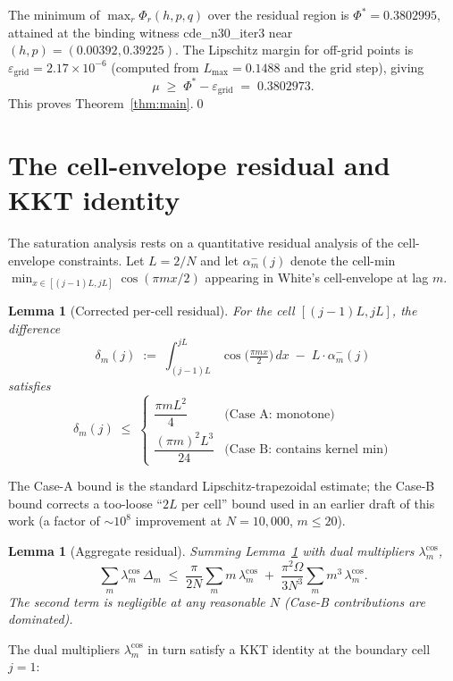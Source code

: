 \documentclass[11pt]{article}
\theoremstyle{plain}
\newtheorem{lemma}[theorem]{Lemma}
\theoremstyle{definition}
\begin{document}
The minimum of $\max_r \Phi_r(h, p, q)$ over the residual region is
$\Phi^* = 0.3802995$, attained at the binding witness
cde\_n30\_iter3 near $(h, p) = (0.00392, 0.39225)$. The Lipschitz
margin for off-grid points is $\varepsilon_{\text{grid}} = 2.17 \times
10^{-6}$ (computed from $L_{\max} = 0.1488$ and the grid step), giving
\[
\mu \;\ge\; \Phi^* - \varepsilon_{\text{grid}}
\;=\; 0.3802973.
\]
This proves Theorem~\ref{thm:main}.\qed

\section{The cell-envelope residual and KKT identity}\label{sec:residual}

The saturation analysis rests on a quantitative residual analysis of
the cell-envelope constraints. Let $L = 2/N$ and let $\alpha_m^-(j)$
denote the cell-min $\min_{x \in [(j-1)L, jL]} \cos(\pi m x / 2)$
appearing in White's cell-envelope at lag $m$.

\begin{lemma}[Corrected per-cell residual]\label{lem:per-cell}
For the cell $[(j-1)L, jL]$, the difference
\[
\delta_m(j) \;:=\; \int_{(j-1)L}^{jL} \cos\bigl(\tfrac{\pi m x}{2}\bigr)\, dx
\;-\; L \cdot \alpha_m^-(j)
\]
satisfies
\[
\delta_m(j) \;\le\;
\begin{cases}
\dfrac{\pi m L^2}{4} & \text{(Case A: monotone)} \\[4pt]
\dfrac{(\pi m)^2 L^3}{24} & \text{(Case B: contains kernel min)}
\end{cases}
\]
\end{lemma}

The Case-A bound is the standard Lipschitz-trapezoidal estimate; the
Case-B bound corrects a too-loose ``$2L$ per cell'' bound used in an
earlier draft of this work (a factor of $\sim 10^8$ improvement at
$N = 10{,}000$, $m \le 20$).

\begin{lemma}[Aggregate residual]\label{lem:aggregate}
Summing Lemma~\ref{lem:per-cell} with dual multipliers
$\lambda_m^{\cos}$,
\[
\sum_m \lambda_m^{\cos}\, \Delta_m \;\le\;
\frac{\pi}{2N} \sum_m m\, \lambda_m^{\cos}
\;+\;
\frac{\pi^2 \Omega}{3 N^3} \sum_m m^3\, \lambda_m^{\cos}.
\]
The second term is negligible at any reasonable $N$ (Case-B
contributions are dominated).
\end{lemma}

The dual multipliers $\lambda_m^{\cos}$ in turn satisfy a KKT identity
at the boundary cell $j=1$:
\end{document}

